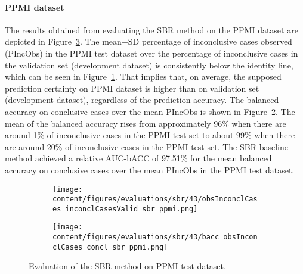 


\paragraph{PPMI dataset}

The results obtained from evaluating the SBR method on the PPMI dataset 
are depicted in Figure~\ref{fig:perf_results_sbr_ppmi}.
The mean$\pm$SD percentage of inconclusive cases observed (PIncObs) in the PPMI test dataset 
over the percentage of inconclusive cases in the validation set (development dataset) 
is consistently below the identity line, 
which can be seen in Figure~\ref{fig:obsInconclCases_inconclCasesValid_sbr_ppmi}.
That implies that, on average, the supposed prediction certainty on PPMI dataset is higher than on validation set (development dataset),
regardless of the prediction accuracy.
The balanced accuracy on conclusive cases over the mean PIncObs is shown 
in Figure~\ref{fig:bacc_obsInconclCases_concl_sbr_ppmi}.
The mean of the balanced accuracy rises from approximately 96\% 
when there are around 1\% of inconclusive cases in the PPMI test set to about 99\% 
when there are around 20\% of inconclusive cases in the PPMI test set.
The SBR baseline method achieved a relative AUC-bACC of 97.51\% for the mean balanced accuracy on conclusive cases 
over the mean PIncObs in the PPMI test dataset.


\begin{figure}[ht]
  \begin{subfigure}{0.49\textwidth}
    \centering
    \texttt{[image: content/figures/evaluations/sbr/43/obsInconclCases\_inconclCasesValid\_sbr\_ppmi.png]}
    \label{fig:obsInconclCases_inconclCasesValid_sbr_ppmi}
  \end{subfigure}
  \hfill
  \begin{subfigure}{0.49\textwidth}
    \centering
    \texttt{[image: content/figures/evaluations/sbr/43/bacc\_obsInconclCases\_concl\_sbr\_ppmi.png]}
    \label{fig:bacc_obsInconclCases_concl_sbr_ppmi}
  \end{subfigure}
  \caption{Evaluation of the SBR method on PPMI test dataset.}
  \label{fig:perf_results_sbr_ppmi}
\end{figure}



